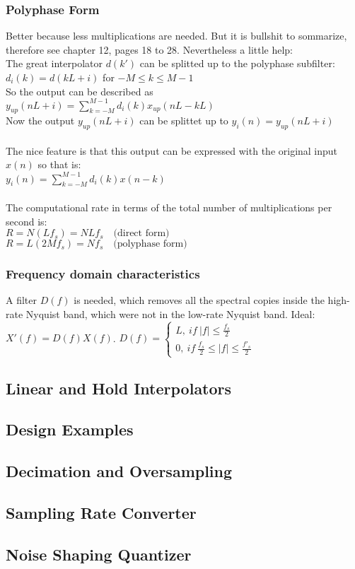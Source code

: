 \subsubsection{Polyphase Form}
Better because less multiplications are needed. But it is bullshit to sommarize, therefore see chapter 12, pages 18 to 28.
Nevertheless a little help:\\
The great interpolator $d(k')$ can be splitted up to the polyphase subfilter: $d_i(k) = d(kL+i)$ for $-M\leq k \leq M-1$\\
So the output can be described as $y_{up}(nL+i)=\sum\limits_{k=-M}^{M-1} d_i(k) x_{up}(nL-kL)$\\
Now the output $y_{up}(nL+i)$ can be splittet up to $y_i(n)=y_{up}(nL+i)$\\\\
The nice feature is that this output can be expressed with the original input $x(n)$ so that is:\\ $y_i(n)=\sum\limits_{k=-M}^{M-1} d_i(k) x(n-k)$\\\\
The computational rate in terms of the total number of multiplications per second is:\\
 $R=N (L f_s)=N L f_s \quad \text{(direct form)}$\\
 $R=L (2M f_s)=N f_s \quad \text{(polyphase form)}$\\
\subsubsection{Frequency domain characteristics}
A filter $D(f)$ is needed, which removes all the spectral copies inside the high-rate Nyquist band, which were not in the low-rate Nyquist band. Ideal: $X'(f) = D(f)X(f)$.
$D(f)=\begin{cases} L,\ if\ |f|\leq\frac{f_s}{2}\\
0,\ if\ \frac{f_s}{2}\leq |f|\leq\frac{f'_s}{2}
\end{cases}$

\subsection{Linear and Hold Interpolators}
\subsection{Design Examples}
\subsection{Decimation and Oversampling}
\subsection{Sampling Rate Converter}
\subsection{Noise Shaping Quantizer}
